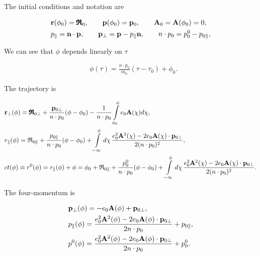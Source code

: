 The initial conditions and notation are
\begin{highlightbox}
    \begin{align}
        & {\bf r}(\phi_0)={\pmb{\mathfrak R}}_0,\qquad
        {\bf p}(\phi_0)={\bf p}_0,\qquad
        {\bf A}_0={\bf A}(\phi_0)=0, \\
        & p_{\parallel}={\bf n}\cdot{\bf p},\qquad
        {\bf p}_{\perp}={\bf p}-p_{\parallel}{\bf n},\qquad
        n\cdot p_0=p_0^0-p_{0\parallel}, 
    \end{align} 
    \end{highlightbox}
    We can see that $\phi$ depends linearly on $\tau$
    \begin{highlightbox}
    \begin{align}
        & \phi(\tau)=\frac{n\cdot p_0}{m_0}(\tau-\tau_0)+\phi_0.
    \end{align}
\end{highlightbox}
The trajectory is
\begin{highlightbox}
    \begin{align}
         & {\bf r}_{\perp}(\phi)={\pmb{\mathfrak R}}_{0\perp}
         +\frac{{\bf p}_{0\perp}}{n\cdot p_0}(\phi-\phi_0)
         -\frac{1}{n\cdot p_0}\int\limits_{\phi_0}^{\phi}e_0{\bf A}(\chi)d\chi, \\
         & r_{\parallel}(\phi)={\mathfrak R}_{0\parallel}
         +\frac{p_{0\parallel}}{n\cdot p_0}(\phi-\phi_0)
         +\int\limits_{-\infty}^{\phi}d\chi\,
         \frac{e_0^2{\bf A}^2(\chi)-2e_0{\bf A}(\chi)\cdot{\bf p}_{0\perp}}{2(n\cdot p_0)^2}, \\
         & ct(\phi)\equiv r^0(\phi)=r_{\parallel}(\phi)+\phi
         =\phi_0+{\mathfrak R}_{0\parallel}
         +\frac{p_0^0}{n\cdot p_0}(\phi-\phi_0)
         +\int\limits_{-\infty}^{\phi}d\chi\,
         \frac{e_0^2{\bf A}^2(\chi)-2e_0{\bf A}(\chi)\cdot{\bf p}_{0\perp}}{2(n\cdot p_0)^2}.
    \end{align}
\end{highlightbox}
The four-momentum is
\begin{highlightbox}
    \begin{align}
         & {\bf p}_{\perp}(\phi) = -e_0{\bf A}(\phi)+{\bf p}_{0\perp}, \\
         & p_{\parallel}(\phi) = \frac{e_0^2{\bf A}^2(\phi)-2e_0{\bf A}(\phi)\cdot{\bf p}_{0\perp}}{2n\cdot p_0}+p_{0\parallel}, \\
         & p^0(\phi) = \frac{e_0^2{\bf A}^2(\phi)-2e_0{\bf A}(\phi)\cdot{\bf p}_{0\perp}}{2n\cdot p_0}+p_0^0.
    \end{align}
\end{highlightbox}
